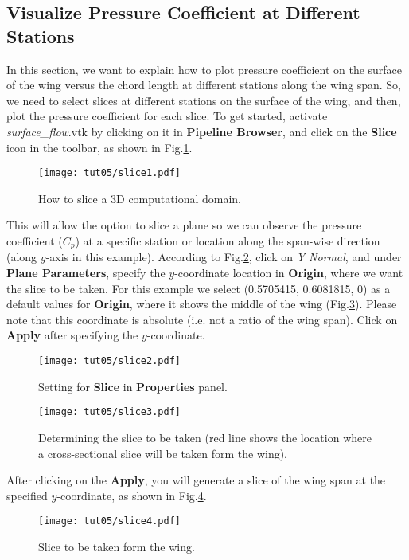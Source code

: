 \subsection{Visualize Pressure Coefficient at Different Stations}
In this section, we want to explain how to plot pressure coefficient on the surface of the wing versus the chord length at different stations along the wing span. So, we need to select slices at different stations on the surface of the wing, and then, plot the pressure coefficient for each slice. To get started, activate \textit{surface\_flow}.vtk by clicking on it in \textbf{Pipeline Browser}, and click on the \textbf{Slice} icon in the toolbar, as shown in Fig.\ref{fig5:slice1}.
\begin{figure}[htbp]
    \centering
    \texttt{[image: tut05/slice1.pdf]}
    \caption{How to slice a 3D computational domain.}
    \label{fig5:slice1}
\end{figure}
This will allow the option to slice a plane so we can observe the pressure coefficient ($C_p$) at a specific station
or location along the span-wise direction (along $y$-axis in this example). According to Fig.\ref{fig5:slice2}, click on \textit{Y Normal}, and under \textbf{Plane Parameters}, specify the $y$-coordinate location in \textbf{Origin}, where we want the slice to be taken. For this example we select (0.5705415, 0.6081815, 0) as a default values for \textbf{Origin}, where it shows the middle of the wing (Fig.\ref{fig5:slice3}). Please note that this coordinate is absolute (i.e. not a ratio of the wing span). Click on \textbf{Apply} after specifying the $y$-coordinate.
\begin{figure}[htbp]
    \centering
    \texttt{[image: tut05/slice2.pdf]}
    \caption{Setting for \textbf{Slice} in \textbf{Properties} panel.}
    \label{fig5:slice2}
\end{figure}
\begin{figure}[htbp]
    \centering
    \texttt{[image: tut05/slice3.pdf]}
    \caption{Determining the slice to be taken (red line shows the location where a cross-sectional slice will be taken form the wing).}
    \label{fig5:slice3}
\end{figure}
After clicking on the \textbf{Apply}, you will generate a slice of the wing span at the specified $y$-coordinate, as shown in Fig.\ref{fig5:slice4}.
\begin{figure}[htbp]
    \centering
    \texttt{[image: tut05/slice4.pdf]}
    \caption{Slice to be taken form the wing.}
    \label{fig5:slice4}
\end{figure}
